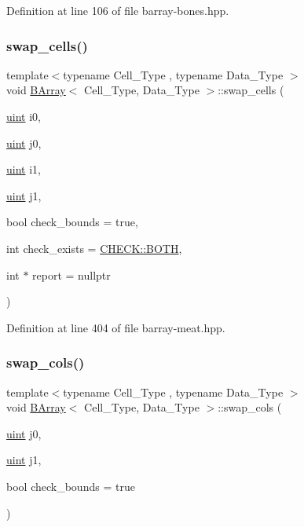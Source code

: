 Definition at line 106 of file barray-\/bones.\+hpp.

\mbox{\label{class_b_array_afb7976f67770b850922c1a7e1d6b07cc}} 
\subsubsection{\texorpdfstring{swap\+\_\+cells()}{swap\_cells()}}
{\footnotesize\ttfamily template$<$typename Cell\+\_\+\+Type , typename Data\+\_\+\+Type $>$ \\
void \hyperlink{class_b_array}{B\+Array}$<$ Cell\+\_\+\+Type, Data\+\_\+\+Type $>$\+::swap\+\_\+cells (\begin{DoxyParamCaption}\item[{\hyperlink{typedefs_8hpp_a91ad9478d81a7aaf2593e8d9c3d06a14}{uint}}]{i0,  }\item[{\hyperlink{typedefs_8hpp_a91ad9478d81a7aaf2593e8d9c3d06a14}{uint}}]{j0,  }\item[{\hyperlink{typedefs_8hpp_a91ad9478d81a7aaf2593e8d9c3d06a14}{uint}}]{i1,  }\item[{\hyperlink{typedefs_8hpp_a91ad9478d81a7aaf2593e8d9c3d06a14}{uint}}]{j1,  }\item[{bool}]{check\+\_\+bounds = {\ttfamily true},  }\item[{int}]{check\+\_\+exists = {\ttfamily \hyperlink{namespace_c_h_e_c_k_a3acda1c74bfabb5b6b67e19d0ad2d52a}{C\+H\+E\+C\+K\+::\+B\+O\+TH}},  }\item[{int $\ast$}]{report = {\ttfamily nullptr} }\end{DoxyParamCaption})\hspace{0.3cm}{\ttfamily [inline]}}



Definition at line 404 of file barray-\/meat.\+hpp.

\mbox{\label{class_b_array_ae94f7e61ca5985244968d9daf2859229}} 
\subsubsection{\texorpdfstring{swap\+\_\+cols()}{swap\_cols()}}
{\footnotesize\ttfamily template$<$typename Cell\+\_\+\+Type , typename Data\+\_\+\+Type $>$ \\
void \hyperlink{class_b_array}{B\+Array}$<$ Cell\+\_\+\+Type, Data\+\_\+\+Type $>$\+::swap\+\_\+cols (\begin{DoxyParamCaption}\item[{\hyperlink{typedefs_8hpp_a91ad9478d81a7aaf2593e8d9c3d06a14}{uint}}]{j0,  }\item[{\hyperlink{typedefs_8hpp_a91ad9478d81a7aaf2593e8d9c3d06a14}{uint}}]{j1,  }\item[{bool}]{check\+\_\+bounds = {\ttfamily true} }\end{DoxyParamCaption})\hspace{0.3cm}{\ttfamily [inline]}}




